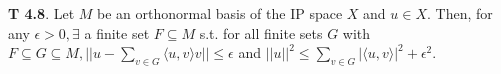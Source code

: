 {\bf T 4.8}. Let $M$ be an orthonormal basis of the IP space $X$ and $u \in X$. Then, for any $\epsilon >0, \exists$ a finite set $F \subseteq M$ s.t. for all finite sets $G$ with $F \subseteq G \subseteq M, ||u-\sum_{v \in G}\langle u,v\rangle v ||\leq \epsilon$ and $||u||^2 \leq \sum_{v \in G}|\langle u,v\rangle|^2 + \epsilon^2$. 

